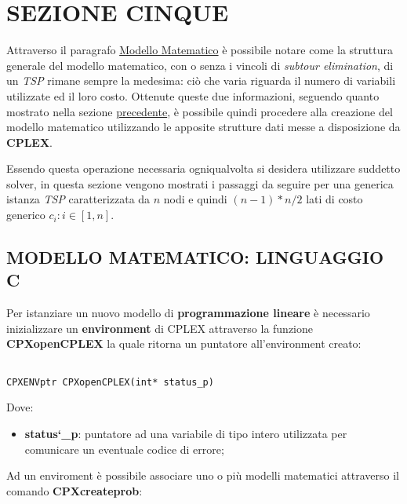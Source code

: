 \documentclass[11pt]{article}
\begin{document}
\newpage

\section*{SEZIONE CINQUE}
\label{sec:SezioneCinqueS}

Attraverso il paragrafo \hyperref[sec:ModelloMatematicoS]{Modello Matematico} è possibile notare come la struttura generale del modello matematico, con o senza i vincoli di \textit{subtour elimination}, di un \textit{TSP} rimane sempre la medesima: ciò che varia riguarda il numero di variabili utilizzate ed il loro costo. Ottenute queste due informazioni, seguendo quanto mostrato nella sezione \hyperref[sec:SezioneQuattroS]{precedente}, è possibile quindi procedere alla creazione del modello matematico utilizzando le apposite strutture dati messe a disposizione da \textbf{CPLEX}.

Essendo questa operazione necessaria ogniqualvolta si desidera utilizzare suddetto solver, in questa sezione vengono mostrati i passaggi da seguire per una generica istanza \textit{TSP} caratterizzata da $n$ nodi e quindi $(n-1)*n/2$ lati di costo generico $c_{i}: i \in \left [ 1,n \right ]$.

\subsection*{MODELLO MATEMATICO: LINGUAGGIO C}
\label{sec:ModelloCS}

Per istanziare un nuovo modello di \textbf{programmazione lineare} è necessario inizializzare un \textbf{environment} di CPLEX attraverso la funzione \textbf{CPXopenCPLEX} la quale ritorna un puntatore all'environment creato:


\begin{lstlisting}

CPXENVptr CPXopenCPLEX(int* status_p)

\end{lstlisting}

Dove:

\begin{itemize}
\item \textbf{status\char`\_p}: puntatore ad una variabile di tipo intero utilizzata per comunicare un eventuale codice di errore;
\end{itemize}

Ad un enviroment è possibile associare uno o più modelli matematici attraverso il comando \textbf{CPXcreateprob}:
\end{document}
